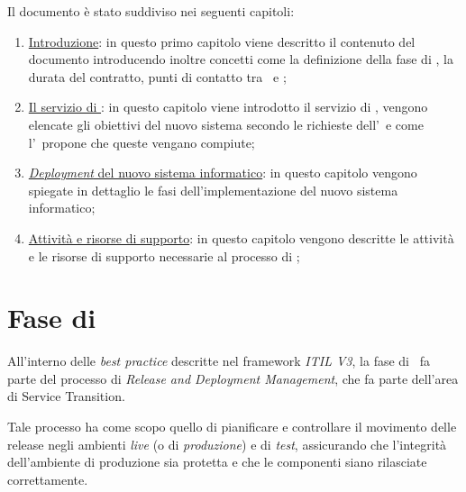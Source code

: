 		Il documento è stato suddiviso nei seguenti capitoli:
		\begin{enumerate}[noitemsep]
			
			\item \hyperref[ch:introduzione]{Introduzione}: in questo primo capitolo viene descritto il contenuto del documento introducendo inoltre concetti come la definizione della fase di \rollout, la durata del contratto, punti di contatto tra \azienda~e \istituto;
			
			\item \hyperref[ch:servizio_helpdesk]{Il servizio di \helpdesk}: in questo capitolo viene introdotto il servizio di \helpdesk, vengono elencate gli obiettivi del nuovo sistema secondo le richieste dell'\istituto~e come l'\azienda~propone che queste vengano compiute;
			
			\item \hyperref[ch:implementazione]{\textit{Deployment} del nuovo sistema informatico}: in questo capitolo vengono spiegate in dettaglio le fasi dell'implementazione del nuovo sistema informatico;
			
			\item \hyperref[ch:supporto]{Attività e risorse di supporto}: in questo capitolo vengono descritte le attività e le risorse di supporto necessarie al processo di \rollout;
			
			
			
		\end{enumerate}
	
\section{Fase di \rollout}

	All'interno delle \textit{best practice} descritte nel framework \textit{ITIL V3}\cite{itil_website}, la fase di \rollout~fa parte del processo di \textit{Release and Deployment Management}, che fa parte dell'area di Service Transition.
	
	Tale processo ha come scopo quello di pianificare e controllare il movimento delle release negli ambienti \textit{live} (o di \textit{produzione}) e di \textit{test}, assicurando che l'integrità dell'ambiente di produzione sia protetta e che le componenti siano rilasciate correttamente.
	

